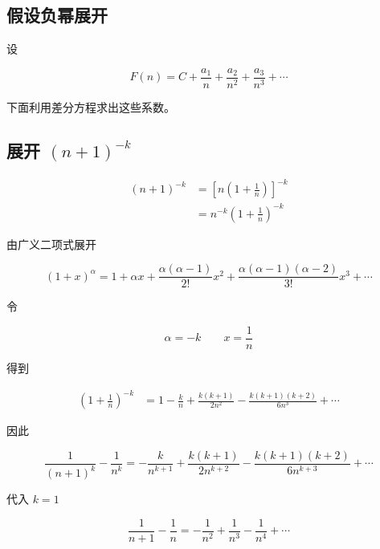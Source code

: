 \documentclass[11pt]{article}%
\begin{document}
    \subsection{假设负幂展开}

    设

    \[
    \boxed{
    F(n)
    =
    C
    +\frac{a_1}{n}
    +\frac{a_2}{n^2}
    +\frac{a_3}{n^3}
    +\cdots
    }
    \]

    \vspace{1em}
    下面利用差分方程求出这些系数。

    \subsection{展开 $(n+1)^{-k}$}

    \[
    \begin{aligned}
    (n+1)^{-k}
    &=
    \left[n\left(1+\frac{1}{n}\right)\right]^{-k} \\
    &=
    n^{-k}\left(1+\frac{1}{n}\right)^{-k}
    \end{aligned}
    \]

    \vspace{1em}
    由广义二项式展开

    \[
    (1+x)^\alpha
    =
    1+\alpha x
    +\frac{\alpha(\alpha-1)}{2!}x^2
    +\frac{\alpha(\alpha-1)(\alpha-2)}{3!}x^3
    +\cdots
    \]

    \vspace{1em}
    令

    \[
    \alpha=-k \qquad x=\frac{1}{n}
    \]

    \vspace{1em}
    得到

    \[
    \begin{aligned}
    \left(1+\frac{1}{n}\right)^{-k}
    &=
    1-\frac{k}{n}
    +\frac{k(k+1)}{2n^2}
    -\frac{k(k+1)(k+2)}{6n^3}
    +\cdots
    \end{aligned}
    \]

    \vspace{1em}
    因此

    \[
    \boxed{
    \frac{1}{(n+1)^k}
    -
    \frac{1}{n^k}
    =
    -\frac{k}{n^{k+1}}
    +\frac{k(k+1)}{2n^{k+2}}
    -\frac{k(k+1)(k+2)}{6n^{k+3}}
    +\cdots
    }
    \]

    \vspace{1em}
    代入 \(k=1\)

    \[
    \boxed{
    \frac{1}{n+1}
    -
    \frac{1}{n}
    =
    -\frac{1}{n^2}
    +\frac{1}{n^3}
    -\frac{1}{n^4}
    +\cdots
    }
    \]
\end{document}
